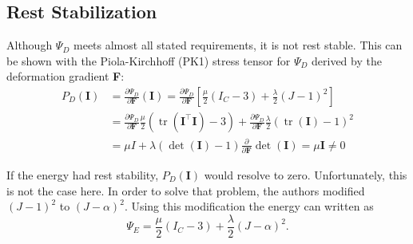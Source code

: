 
\subsection{Rest Stabilization}
Although $\Psi_{D}$ meets almost all stated requirements, it is not rest stable. This can be shown with the Piola-Kirchhoff (PK1) stress tensor for $\Psi_D$ derived by the deformation gradient \textbf{F}:
\begin{align*}
P_{D}(\mathbf{I}) &= \frac{\partial \Psi_{D}}{\partial \mathbf{F}} (\mathbf{I}) = \frac{\partial \Psi_{D}}{\partial \mathbf{F}} \left[ \frac{\mu}{2}\left(I_{C}-3\right) +\frac{\lambda}{2}(J-1)^{2} \right] \\
&= \frac{\partial \Psi_{D}}{\partial \mathbf{F}}  \frac{\mu}{2}\left(\operatorname{tr}(\mathbf{I}^\intercal \mathbf{I})-3\right) +\frac{\partial \Psi_{D}}{\partial \mathbf{F}} \frac{\lambda}{2}(\operatorname{tr}(\mathbf{I})-1)^{2} \\
&= \mu I + \lambda (\operatorname{det}(\mathbf{I})-1)  \frac{\partial}{\partial \mathbf{F}} \operatorname{det}(\mathbf{I}) = \mu \mathbf{I} \neq 0
\end{align*}

If the energy had rest stability, $P_{D}(\mathbf{I})$ would resolve to zero. Unfortunately, this is not the case here. In order to solve that problem, the authors modified $(J-1)^{2}$ to $(J-\alpha)^{2}$. Using this modification the energy can written as
\[
\Psi_{E} = \frac{\mu}{2}\left(I_{C}-3\right) +\frac{\lambda}{2}(J-\alpha)^{2}.
\]

